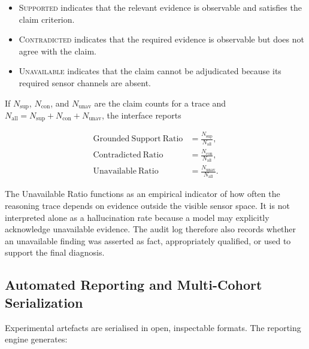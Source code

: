 \documentclass{ssnreview}
\begin{document}
\begin{itemize}
  \item \textsc{Supported} indicates that the relevant evidence is observable and satisfies
  the claim criterion.

  \item \textsc{Contradicted} indicates that the required evidence is observable but does
  not agree with the claim.

  \item \textsc{Unavailable} indicates that the claim cannot be adjudicated because its
  required sensor channels are absent.
\end{itemize}

If $N_{\mathrm{sup}}$, $N_{\mathrm{con}}$, and $N_{\mathrm{unav}}$ are the claim counts
for a trace and
$N_{\mathrm{all}}=N_{\mathrm{sup}}+N_{\mathrm{con}}+N_{\mathrm{unav}}$, the
interface reports

\begin{align}
  \mathrm{Grounded\ Support\ Ratio}
  &=\frac{N_{\mathrm{sup}}}{N_{\mathrm{all}}},
  \label{eq:support-ratio}\\
  \mathrm{Contradicted\ Ratio}
  &=\frac{N_{\mathrm{con}}}{N_{\mathrm{all}}},
  \label{eq:contradicted-ratio}\\
  \mathrm{Unavailable\ Ratio}
  &=\frac{N_{\mathrm{unav}}}{N_{\mathrm{all}}}.
  \label{eq:unavailable-ratio}
\end{align}

The Unavailable Ratio functions as an empirical indicator of how often the reasoning trace
depends on evidence outside the visible sensor space. It is not interpreted alone as a
hallucination rate because a model may explicitly acknowledge unavailable evidence. The
audit log therefore also records whether an unavailable finding was asserted as fact,
appropriately qualified, or used to support the final diagnosis.

\subsection{Automated Reporting and Multi-Cohort Serialization}

Experimental artefacts are serialised in open, inspectable formats. The reporting engine
generates:
\end{document}
